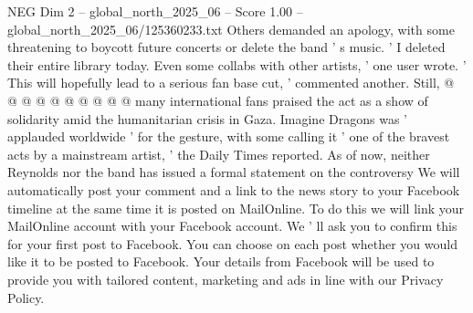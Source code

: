 \begin{textsample}{NEG Dim 2 – global\_north\_2025\_06 – Score 1.00 – global\_north\_2025\_06/125360233.txt}
Others demanded an apology, with some threatening to boycott future concerts or delete the band ' s music. ' I deleted their entire library today.
Even some collabs with other artists, ' one user wrote. ' This will hopefully lead to a serious fan base cut, ' commented another.
Still, @ @ @ @ @ @ @ @ @ @ many international fans praised the act as a show of solidarity amid the humanitarian crisis in Gaza.
Imagine Dragons was ' applauded worldwide ' for the gesture, with some calling it ' one of the bravest acts by a mainstream artist, ' the Daily Times reported.
As of now, neither Reynolds nor the band has issued a formal statement on the controversy We will automatically post your comment and a link to the news story to your Facebook timeline at the same time it is posted on MailOnline.
To do this we will link your MailOnline account with your Facebook account.
We ' ll ask you to confirm this for your first post to Facebook.
You can choose on each post whether you would like it to be posted to Facebook.
Your details from Facebook will be used to provide you with tailored content, marketing and ads in line with our Privacy Policy.

\end{textsample}
